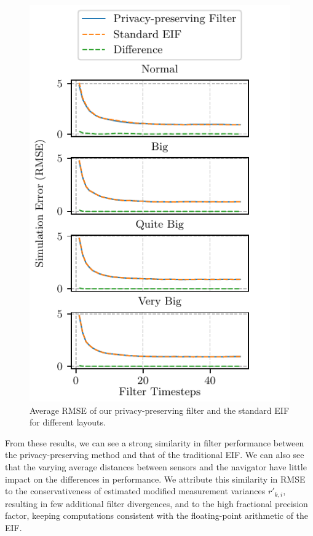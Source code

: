\documentclass[10pt,letterpaper,oneside,twocolumn,journal]{IEEEtran}
\theoremstyle{definition}
\theoremstyle{definition}
\theoremstyle{remark}
\begin{document}
\begin{figure}[htbp]
    \centering
    \includegraphics{images/layout_errors.pdf}
    \caption{Average RMSE of our privacy-preserving filter and the standard EIF for different layouts.}
    \vspace{-\baselineskip}
    \label{fig:sim_layout_errors}
\end{figure}
From these results, we can see a strong similarity in filter performance between the privacy-preserving method and that of the traditional EIF. We can also see that the varying average distances between sensors and the navigator have little impact on the differences in performance. We attribute this similarity in RMSE to the conservativeness of estimated modified measurement variances $r'_{k,i}$, resulting in few additional filter divergences, and to the high fractional precision factor, keeping computations consistent with the floating-point arithmetic of the EIF.
\end{document}
